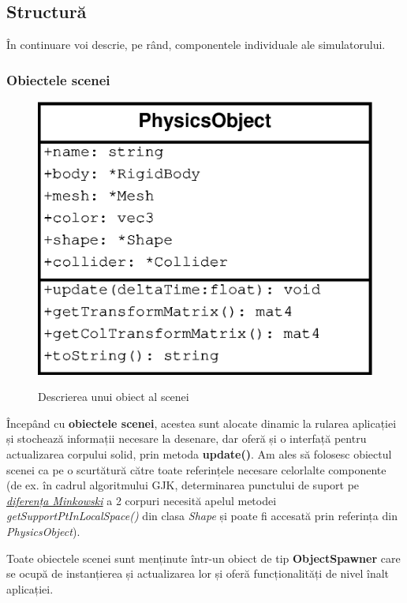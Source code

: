 \documentclass[12pt,a4paper]{report}
\begin{document}
\subsection{Structură}
În continuare voi descrie, pe rând, componentele individuale ale simulatorului.

\subsubsection{Obiectele scenei}
\begin{figure}[H]
	\centering
	\includegraphics[width=0.4\linewidth]{pics/cap4_00.eps}
	\label{fig:physicsObject}
	\caption[]{Descrierea unui obiect al scenei}
\end{figure}

Începând cu \textbf{obiectele scenei}, acestea sunt alocate dinamic la rularea aplicației și stochează informații necesare la desenare, dar oferă și o interfață pentru actualizarea corpului solid, prin metoda \textbf{update()}. Am ales să folosesc obiectul scenei ca pe o scurtătură către toate referințele necesare celorlalte componente (de ex. în cadrul algoritmului GJK, determinarea punctului de suport pe \hyperref[minkowski_difference]{\textit{diferența Minkowski}} a 2 corpuri necesită apelul metodei \textit{getSupportPtInLocalSpace()} din clasa \textit{Shape} și poate fi accesată prin referința din \textit{PhysicsObject}).

Toate obiectele scenei sunt menținute într-un obiect de tip \textbf{ObjectSpawner} care se ocupă de instanțierea și actualizarea lor și oferă funcționalități de nivel înalt aplicației.
\end{document}
